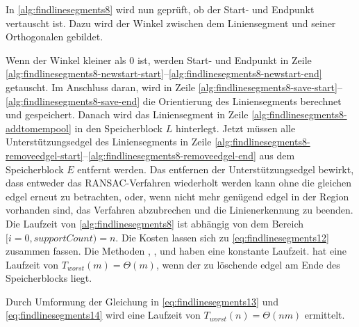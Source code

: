 In \autoref{alg:findlinesegments8} wird nun geprüft, ob der Start- und Endpunkt vertauscht ist. Dazu wird der Winkel
 zwischen dem Liniensegment und seiner Orthogonalen gebildet.

Wenn der Winkel kleiner als $0$ ist, werden Start- und Endpunkt in Zeile
 \ref{alg:findlinesegments8-newstart-start}--\ref{alg:findlinesegments8-newstart-end} getauscht. Im Anschluss daran,
 wird in Zeile \ref{alg:findlinesegments8-save-start}--\ref{alg:findlinesegments8-save-end} die Orientierung des
 Liniensegments berechnet und gespeichert. Danach wird das Liniensegment in Zeile
 \ref{alg:findlinesegments8-addtomempool} in den Speicherblock $L$ hinterlegt. Jetzt müssen alle Unterstützungsedgel
 des Liniensegments in Zeile \ref{alg:findlinesegments8-removeedgel-start}--\ref{alg:findlinesegments8-removeedgel-end}
 aus dem Speicherblock $E$ entfernt werden. Das entfernen der Unterstützungsedgel bewirkt, dass entweder das
 RANSAC-Verfahren wiederholt werden kann ohne die gleichen \gls{edgel} erneut zu betrachten, oder, wenn nicht mehr
 genügend \gls{edgel} in der Region vorhanden sind, das Verfahren abzubrechen und die Linienerkennung zu beenden. Die
 Laufzeit von \autoref{alg:findlinesegments8} ist abhängig von dem Bereich $[i = 0,\mathit{supportCount}) = n$. Die
 Kosten lassen sich zu \autoref{eq:findlinesegments12} zusammen fassen. Die Methoden ,
 ,  und  haben eine konstante Laufzeit.
  hat eine Laufzeit von $T_{worst}(m)=\Theta(m)$, wenn der zu löschende \gls{edgel} am Ende des
 Speicherblocks liegt.

Durch Umformung der Gleichung in \autoref{eq:findlinesegments13} und \autoref{eq:findlinesegments14} wird eine Laufzeit
 von $T_{worst}(n)=\Theta(nm)$ ermittelt.

